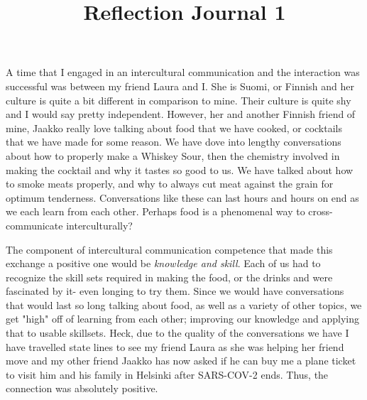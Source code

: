 \documentclass[12pt]{article}
\begin{document}
\title{Reflection Journal 1}





\par
A time that I engaged in an intercultural communication and the interaction was successful was between my friend Laura and I. She is Suomi, or Finnish and her culture is quite a bit different in comparison to mine. Their culture is quite shy and I would say pretty independent. However, her and another Finnish friend of mine, Jaakko really love talking about food that we have cooked, or cocktails that we have made for some reason. We have dove into lengthy conversations about how to properly make a Whiskey Sour, then the chemistry involved in making the cocktail and why it tastes so good to us. We have talked about how to smoke meats properly, and why to always cut meat against the grain for optimum tenderness. Conversations like these can last hours and hours on end as we each learn from each other. Perhaps food is a phenomenal way to cross-communicate interculturally? 
\par
The component of intercultural communication competence that made this exchange a positive one would be \emph{knowledge and skill}. Each of us had to recognize the skill sets required in making the food, or the drinks and were fascinated by it- even longing to try them. Since we would have conversations that would last so long talking about food, as well as a variety of other topics, we get "high" off of learning from each other; improving our knowledge and applying that to usable skillsets. Heck, due to the quality of the conversations we have I have travelled state lines to see my friend Laura as she was helping her friend move and my other friend Jaakko has now asked if he can buy me a plane ticket to visit him and his family in Helsinki after SARS-COV-2 ends. Thus, the connection was absolutely positive.
\end{document}
